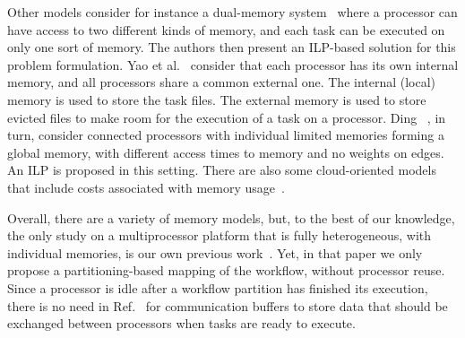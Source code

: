 \documentclass[conference]{IEEEtran}
\newcommand{\new}[1]{{\color{blue}#1}}
\begin{document}
Other models consider for instance a 
dual-memory system~\cite{herrmann2014memory} where a processor can have access 
to two different kinds of memory, and each task can be executed on only one sort of memory.
The authors then present an ILP-based solution for this problem formulation.
%
Yao et al.~\cite{yao2022memory} consider that each processor has its own internal memory, and all
processors share a common external one. The internal (local) memory is used to store the task files.
The external memory is used to store evicted files to make room for the execution of a task on a processor.
%
Ding \etal~\cite{ding2024ils}, in turn, consider connected processors with individual limited memories
forming a global memory, with different access times to memory and no weights on edges. An ILP
is proposed in this setting. 
%
%
There are also some cloud-oriented models that include costs associated with memory usage~\cite{liang2020memory}.

Overall, there are a variety of memory models, but, to the best of our knowledge, the only study on a multiprocessor
platform that is fully heterogeneous, with individual memories, \new{is our own previous work~\cite{DBLP:conf/icpp/KulaginaMB24}.}
\new{Yet, in that paper we only propose} a partitioning-based mapping of the workflow, without processor reuse.
\new{Since a processor is idle after a workflow partition has finished its execution,
there is no need in Ref.~\cite{DBLP:conf/icpp/KulaginaMB24} for communication buffers to store data
that should be \new{exchanged} between processors when tasks are ready to execute.}
\end{document}
